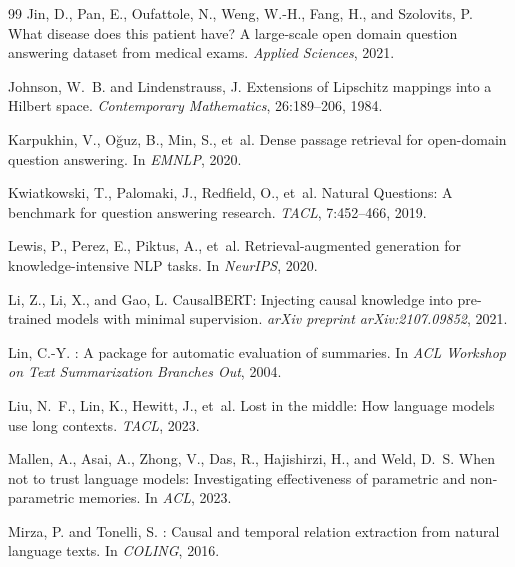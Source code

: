 \documentclass[10pt,twocolumn]{article}
\begin{document}
\begin{thebibliography}{99}
Jin, D., Pan, E., Oufattole, N., Weng, W.-H., Fang, H., and Szolovits, P.
\newblock What disease does this patient have? A large-scale open domain
  question answering dataset from medical exams.
\newblock \emph{Applied Sciences}, 2021.

Johnson, W.~B. and Lindenstrauss, J.
\newblock Extensions of {Lipschitz} mappings into a {Hilbert} space.
\newblock \emph{Contemporary Mathematics}, 26:189--206, 1984.

Karpukhin, V., O\u{g}uz, B., Min, S., et~al.
\newblock Dense passage retrieval for open-domain question answering.
\newblock In \emph{EMNLP}, 2020.

Kwiatkowski, T., Palomaki, J., Redfield, O., et~al.
\newblock Natural Questions: A benchmark for question answering research.
\newblock \emph{TACL}, 7:452--466, 2019.

Lewis, P., Perez, E., Piktus, A., et~al.
\newblock Retrieval-augmented generation for knowledge-intensive {NLP} tasks.
\newblock In \emph{NeurIPS}, 2020.

Li, Z., Li, X., and Gao, L.
\newblock CausalBERT: Injecting causal knowledge into pre-trained models with
  minimal supervision.
\newblock \emph{arXiv preprint arXiv:2107.09852}, 2021.

Lin, C.-Y.
: A package for automatic evaluation of summaries.
\newblock In \emph{ACL Workshop on Text Summarization Branches Out}, 2004.

Liu, N.~F., Lin, K., Hewitt, J., et~al.
\newblock Lost in the middle: How language models use long contexts.
\newblock \emph{TACL}, 2023.

Mallen, A., Asai, A., Zhong, V., Das, R., Hajishirzi, H., and Weld, D.~S.
\newblock When not to trust language models: Investigating effectiveness of
  parametric and non-parametric memories.
\newblock In \emph{ACL}, 2023.

Mirza, P. and Tonelli, S.
: Causal and temporal relation extraction from natural
  language texts.
\newblock In \emph{COLING}, 2016.


\end{thebibliography}
\end{document}
